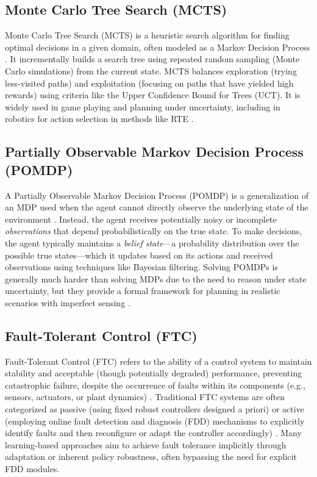 \documentclass[12pt, a4paper]{article} %
\begin{document}
\subsection{Monte Carlo Tree Search (MCTS)}
\label{def:mcts} %

Monte Carlo Tree Search (MCTS) is a heuristic search algorithm for finding optimal decisions in a given domain, often modeled as a Markov Decision Process \citep{coulom2006efficient, kocsis2006bandit}. It incrementally builds a search tree using repeated random sampling (Monte Carlo simulations) from the current state. MCTS balances exploration (trying less-visited paths) and exploitation (focusing on paths that have yielded high rewards) using criteria like the Upper Confidence Bound for Trees (UCT). It is widely used in game playing and planning under uncertainty, including in robotics for action selection in methods like RTE \citep{chatzilygeroudis2018reset}.

\subsection{Partially Observable Markov Decision Process (POMDP)}
\label{def:pomdp} %

A Partially Observable Markov Decision Process (POMDP) is a generalization of an MDP used when the agent cannot directly observe the underlying state of the environment \citep{littman1995, monahan1982state}. Instead, the agent receives potentially noisy or incomplete \textit{observations} that depend probabilistically on the true state. To make decisions, the agent typically maintains a \textit{belief state}—a probability distribution over the possible true states—which it updates based on its actions and received observations using techniques like Bayesian filtering. Solving POMDPs is generally much harder than solving MDPs due to the need to reason under state uncertainty, but they provide a formal framework for planning in realistic scenarios with imperfect sensing \citep[e.g., applied to joint failure uncertainty in][]{pham2024adaptive}.

\subsection{Fault-Tolerant Control (FTC)}
\label{def:ftc} %

Fault-Tolerant Control (FTC) refers to the ability of a control system to maintain stability and acceptable (though potentially degraded) performance, preventing catastrophic failure, despite the occurrence of faults within its components (e.g., sensors, actuators, or plant dynamics) \citep{blanke1997, zhang2008bibliographical}. Traditional FTC systems are often categorized as passive (using fixed robust controllers designed a priori) or active (employing online fault detection and diagnosis (FDD) mechanisms to explicitly identify faults and then reconfigure or adapt the controller accordingly) \citep{ahmed2020fault}. Many learning-based approaches aim to achieve fault tolerance implicitly through adaptation or inherent policy robustness, often bypassing the need for explicit FDD modules.
\end{document}
